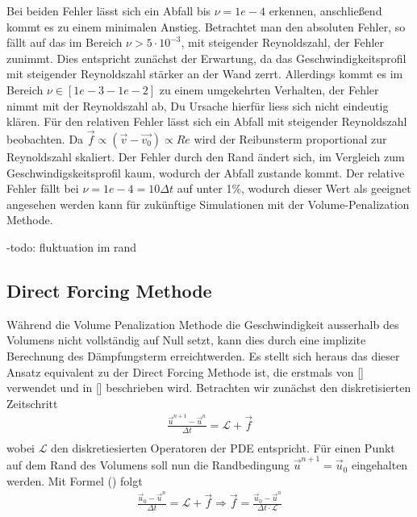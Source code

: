 Bei beiden Fehler lässt sich ein Abfall bis $\nu=1e-4$ erkennen, anschließend kommt es zu einem minimalen Anstieg.
Betrachtet man den absoluten Fehler, so fällt auf das im Bereich $\nu>5\cdot10^{-3}$, mit steigender Reynoldszahl, der Fehler zunimmt.
Dies entspricht zunächst der Erwartung, da das Geschwindigkeitsprofil mit steigender Reynoldszahl stärker an der Wand zerrt.
Allerdings kommt es im Bereich $\nu \in [1e-3 - 1e-2]$ zu einem umgekehrten Verhalten, der Fehler nimmt mit der Reynoldszahl ab,
Du Ursache hierfür liess sich nicht eindeutig klären.
Für den relativen Fehler lässt sich ein Abfall mit steigender Reynoldszahl beobachten. Da $\vec{f} \propto (\vec{v}-\vec{v_0})  \propto Re$ wird der Reibunsterm
proportional zur Reynoldszahl skaliert. Der Fehler durch den Rand ändert sich, im Vergleich zum Geschwindigskeitsprofil kaum, wodurch der Abfall zustande kommt.
Der relative Fehler fällt bei $\nu=1e-4=10\Delta t$ auf unter 1\%, wodurch dieser Wert als geeignet angesehen werden kann für zukünftige Simulationen mit der Volume-Penalization Methode.

-todo: fluktuation im rand


\subsection{Direct Forcing Methode}
Während die Volume Penalization Methode die Geschwindigkeit ausserhalb des Volumens nicht vollständig auf Null setzt,
 kann dies durch eine implizite Berechnung des Dämpfungsterm erreichtwerden. Es stellt sich heraus das dieser Ansatz equivalent
  zu der Direct Forcing Methode ist, die erstmals von [] verwendet und in [] beschrieben wird.
Betrachten wir zunächst den diskretisierten Zeitschritt
\begin{align}
    \frac{\vec{u}^{n+1} -\vec{u}^n}{\Delta t} = \mathscr{L} + \vec{f}\\
\end{align}
wobei $\mathscr{L}$ den diskretiesierten Operatoren der PDE entspricht.
Für einen Punkt auf dem Rand des Volumens soll nun die Randbedingung $\vec{u}^{n+1} = \vec{u}_0$ eingehalten werden.
Mit Formel () folgt
\begin{align}
    \frac{\vec{u}_0 -\vec{u}^n}{\Delta t} = \mathscr{L} + \vec{f} \Rightarrow \vec{f} = \frac{\vec{u}_0 -\vec{u}^n}{\Delta t\cdot \mathscr{L}}\\
\end{align}

